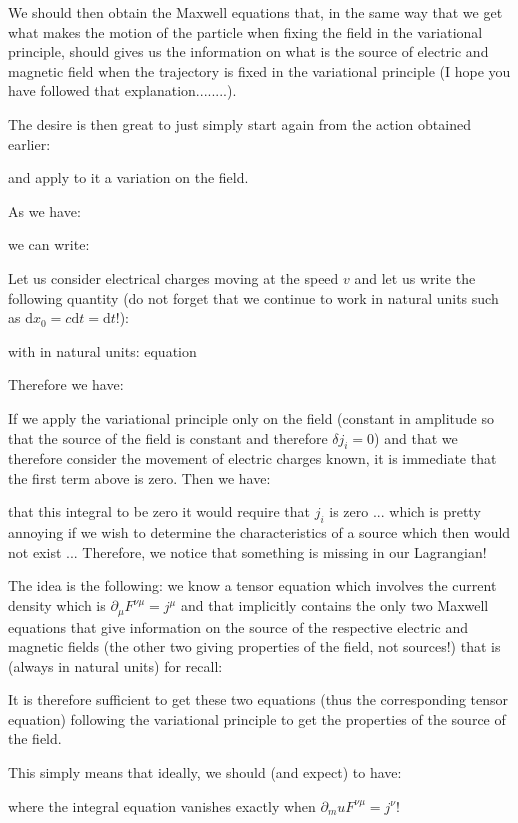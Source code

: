 	We should then obtain the Maxwell equations that, in the same way that we get what makes the motion of the particle when fixing the field in the variational principle, should gives us the information on what is the source of electric and magnetic field when the trajectory is fixed in the variational principle (I hope you have followed that explanation........).

	The desire is then great to just simply start again from the action obtained earlier:
	
	and apply to it a variation on the field.

	As we have:
	
	we can write:
	
	Let us consider electrical charges moving at the speed $v$ and let us write the following quantity (do not forget that we continue to work in natural units such as $\mathrm{d}x_0=c\mathrm{d}t=\mathrm{d}t$!):
	
	with in natural units: equation
	
	Therefore we have:
	
	If we apply the variational principle only on the field (constant in amplitude so that the source of the field is constant and therefore $\delta j_i=0$) and that we therefore consider the movement of electric charges known, it is immediate that the first term above is zero. Then we have:
	
	that this integral to be zero it would require that $j_i$ is zero ... which is pretty annoying if we wish to determine the characteristics of a source which then would not exist ... Therefore, we notice that something is missing in our Lagrangian!

	The idea is the following: we know a tensor equation which involves the current density which is $\partial_\mu F^{\nu\mu}=j^\mu$ and that implicitly contains the only two Maxwell equations that give information on the source of the respective electric and magnetic fields (the other two giving properties of the field, not sources!) that is (always in natural units) for recall:
	
	It is therefore sufficient to get these two equations (thus the corresponding tensor equation) following the variational principle to get the properties of the source of the field.
	
	This simply means that ideally, we should (and expect) to have:
	
	where the integral equation vanishes exactly when $\partial_mu F^{\nu\mu}=j^\nu$!

